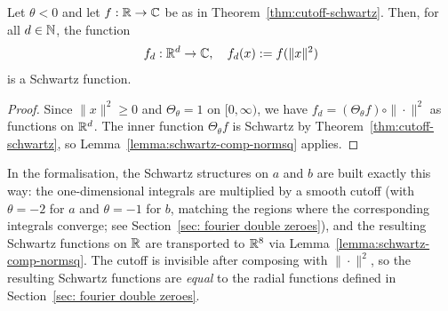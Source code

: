 \begin{corollary}\label{cor:schwartz-of-nonneg-decay}
  Let $\theta < 0$ and let $f : \mathbb{R} \to \mathbb{C}$ be as in Theorem~\ref{thm:cutoff-schwartz}. Then, for all $d \in \mathbb{N}$, the function
  \[
    f_d : \mathbb{R}^d \to \mathbb{C}, \quad f_d(x) := f(\|x\|^2)
  \]
  is a Schwartz function.
\end{corollary}
\begin{proof}
  Since $\|x\|^2 \geq 0$ and $\Theta_\theta = 1$ on $[0, \infty)$, we have $f_d = (\Theta_\theta f) \circ \|\cdot\|^2$ as functions on $\mathbb{R}^d$. The inner function $\Theta_\theta f$ is Schwartz by Theorem~\ref{thm:cutoff-schwartz}, so Lemma~\ref{lemma:schwartz-comp-normsq} applies.
\end{proof}

In the formalisation, the Schwartz structures on $a$ and $b$ are built exactly this way: the one-dimensional integrals are multiplied by a smooth cutoff (with $\theta = -2$ for $a$ and $\theta = -1$ for $b$, matching the regions where the corresponding integrals converge; see Section~\ref{sec: fourier double zeroes}), and the resulting Schwartz functions on $\mathbb{R}$ are transported to $\mathbb{R}^8$ via Lemma~\ref{lemma:schwartz-comp-normsq}. The cutoff is invisible after composing with $\|\cdot\|^2$, so the resulting Schwartz functions are \emph{equal} to the radial functions defined in Section~\ref{sec: fourier double zeroes}.
